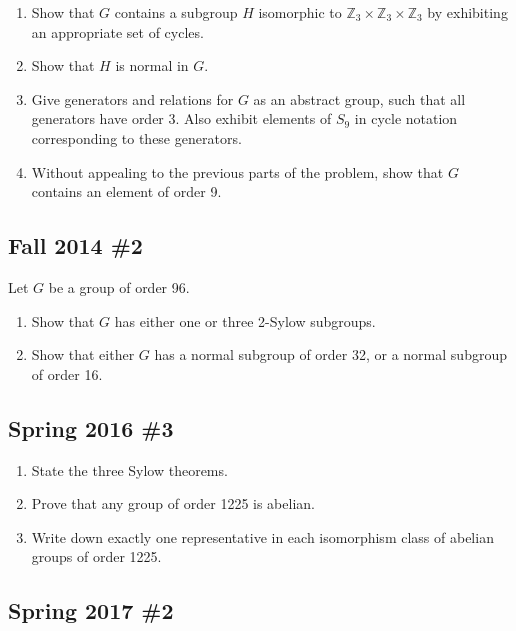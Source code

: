 \begin{enumerate}
\def\labelenumi{\alph{enumi}.}
\item
  Show that \(G\) contains a subgroup \(H\) isomorphic to
  \({\mathbb{Z}}_3 \times{\mathbb{Z}}_3 \times{\mathbb{Z}}_3\) by
  exhibiting an appropriate set of cycles.
\item
  Show that \(H\) is normal in \(G\).
\item
  Give generators and relations for \(G\) as an abstract group, such
  that all generators have order 3. Also exhibit elements of \(S_9\) in
  cycle notation corresponding to these generators.
\item
  Without appealing to the previous parts of the problem, show that
  \(G\) contains an element of order 9.
\end{enumerate}

\hypertarget{fall-2014-2}{%
\subsection{Fall 2014 \#2}\label{fall-2014-2}}

Let \(G\) be a group of order 96.

\begin{enumerate}
\def\labelenumi{\alph{enumi}.}
\item
  Show that \(G\) has either one or three 2-Sylow subgroups.
\item
  Show that either \(G\) has a normal subgroup of order 32, or a normal
  subgroup of order 16.
\end{enumerate}

\hypertarget{spring-2016-3}{%
\subsection{Spring 2016 \#3}\label{spring-2016-3}}

\begin{enumerate}
\def\labelenumi{\alph{enumi}.}
\item
  State the three Sylow theorems.
\item
  Prove that any group of order 1225 is abelian.
\item
  Write down exactly one representative in each isomorphism class of
  abelian groups of order 1225.
\end{enumerate}

\hypertarget{spring-2017-2}{%
\subsection{Spring 2017 \#2}\label{spring-2017-2}}


